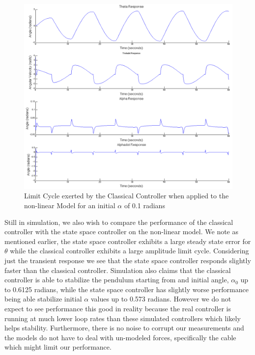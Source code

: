 \documentclass{article}
\theoremstyle{plain}
\theoremstyle{definition}
\theoremstyle{remark}
\begin{document}
\begin{figure}
\begin{center}
\includegraphics[width = 15cm]{ClassicalLimitCycle.png}
\end{center}
\caption{Limit Cycle exerted by the Classical Controller when applied to the non-linear Model for an initial $\alpha$ of 0.1 radians}
\label{ClassicalLimitCycle}
\end{figure}

Still in simulation, we also wish to compare the performance of the classical controller with the state space controller on the non-linear model.  We note as mentioned earlier, the state space controller exhibits a large steady state error for $\theta$ while the classical controller exhibits a large amplitude limit cycle.  Considering just the transient response we see that the state space controller responds slightly faster than the classical controller.  Simulation also claims that the classical controller is able to stabilize the pendulum starting from and initial angle, $\alpha_0$ up to 0.6125 radians, while the state space controller has slightly worse performance being able stabilize initial $\alpha$ values up to 0.573 radians.  However we do not expect to see performance this good in reality because the real controller is running at much lower loop rates than these simulated controllers which likely helps stability.  Furthermore, there is no noise to corrupt our measurements and the models do not have to deal with un-modeled forces, specifically the cable which might limit our performance. 
\end{document}
